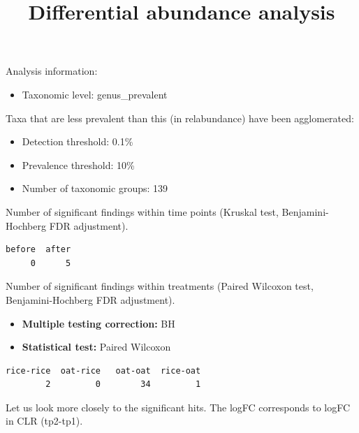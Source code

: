 \documentclass[
]{article}
\title{Differential abundance analysis}
\author{}
\date{}
\providecommand{\tightlist}{%
  \setlength{\itemsep}{0pt}\setlength{\parskip}{0pt}}\usepackage{longtable,booktabs,array}
\begin{document}
\maketitle


Analysis information:

\begin{itemize}
\tightlist
\item
  Taxonomic level: genus\_prevalent
\end{itemize}

Taxa that are less prevalent than this (in relabundance) have been
agglomerated:

\begin{itemize}
\tightlist
\item
  Detection threshold: 0.1\%
\item
  Prevalence threshold: 10\%
\item
  Number of taxonomic groups: 139
\end{itemize}

Number of significant findings within time points (Kruskal test,
Benjamini-Hochberg FDR adjustment).

\begin{verbatim}
before  after 
     0      5 
\end{verbatim}

Number of significant findings within treatments (Paired Wilcoxon test,
Benjamini-Hochberg FDR adjustment).

\begin{itemize}
\tightlist
\item
  \textbf{Multiple testing correction:} BH
\item
  \textbf{Statistical test:} Paired Wilcoxon
\end{itemize}

\begin{verbatim}
rice-rice  oat-rice   oat-oat  rice-oat 
        2         0        34         1 
\end{verbatim}

Let us look more closely to the significant hits. The logFC corresponds
to logFC in CLR (tp2-tp1).
\end{document}
